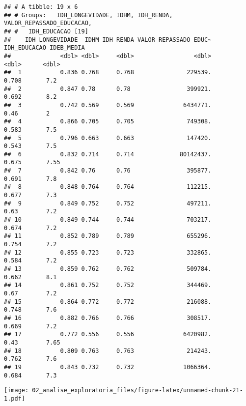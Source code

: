 \documentclass[
]{article}
\newenvironment{Shaded}{\begin{snugshade}}{\end{snugshade}}
\newcommand{\DataTypeTok}[1]{\textcolor[rgb]{0.13,0.29,0.53}{#1}}
\newcommand{\KeywordTok}[1]{\textcolor[rgb]{0.13,0.29,0.53}{\textbf{#1}}}
\newcommand{\NormalTok}[1]{#1}
\newcommand{\OperatorTok}[1]{\textcolor[rgb]{0.81,0.36,0.00}{\textbf{#1}}}
\newcommand{\StringTok}[1]{\textcolor[rgb]{0.31,0.60,0.02}{#1}}
\begin{document}
\begin{verbatim}
## # A tibble: 19 x 6
## # Groups:   IDH_LONGEVIDADE, IDHM, IDH_RENDA, VALOR_REPASSADO_EDUCACAO,
## #   IDH_EDUCACAO [19]
##    IDH_LONGEVIDADE  IDHM IDH_RENDA VALOR_REPASSADO_EDUC~ IDH_EDUCACAO IDEB_MEDIA
##              <dbl> <dbl>     <dbl>                 <dbl>        <dbl>      <dbl>
##  1           0.836 0.768     0.768               229539.        0.708       7.2 
##  2           0.847 0.78      0.78                399921.        0.692       8.2 
##  3           0.742 0.569     0.569              6434771.        0.46        2   
##  4           0.866 0.705     0.705               749308.        0.583       7.5 
##  5           0.796 0.663     0.663               147420.        0.543       7.5 
##  6           0.832 0.714     0.714             80142437.        0.675       7.55
##  7           0.842 0.76      0.76                395877.        0.691       7.8 
##  8           0.848 0.764     0.764               112215.        0.677       7.3 
##  9           0.849 0.752     0.752               497211.        0.63        7.2 
## 10           0.849 0.744     0.744               703217.        0.674       7.2 
## 11           0.852 0.789     0.789               655296.        0.754       7.2 
## 12           0.855 0.723     0.723               332865.        0.584       7.2 
## 13           0.859 0.762     0.762               509784.        0.662       8.1 
## 14           0.861 0.752     0.752               344469.        0.67        7.2 
## 15           0.864 0.772     0.772               216088.        0.748       7.6 
## 16           0.882 0.766     0.766               308517.        0.669       7.2 
## 17           0.772 0.556     0.556              6420982.        0.43        7.65
## 18           0.809 0.763     0.763               214243.        0.762       7.6 
## 19           0.843 0.732     0.732              1066364.        0.684       7.3
\end{verbatim}

\begin{Shaded}
\end{Shaded}

\texttt{[image: 02\_analise\_exploratoria\_files/figure-latex/unnamed-chunk-21-1.pdf]}

\begin{Shaded}
\end{Shaded}
\end{document}
